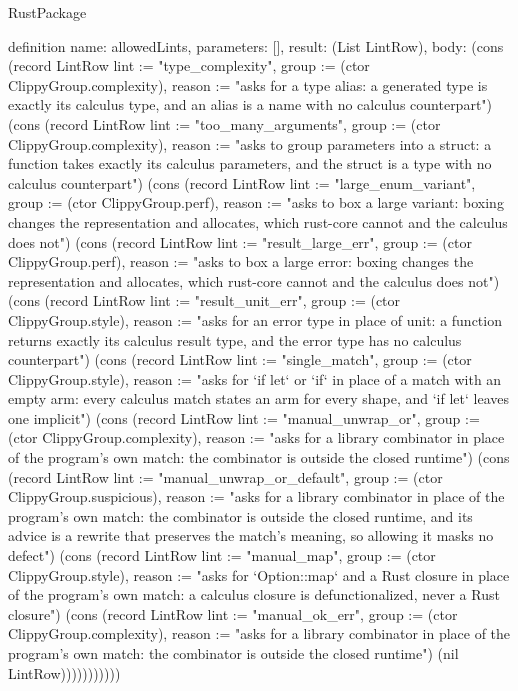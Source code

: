 \begin{lexlean}{RustPackage}
\begin{semanticmodule}
definition{
  name: allowedLints,
  parameters: [],
  result: (List LintRow),
  body: (cons (record LintRow {lint := "type_complexity", group := (ctor ClippyGroup.complexity), reason := "asks for a type alias: a generated type is exactly its calculus type, and an alias is a name with no calculus counterpart"}) (cons (record LintRow {lint := "too_many_arguments", group := (ctor ClippyGroup.complexity), reason := "asks to group parameters into a struct: a function takes exactly its calculus parameters, and the struct is a type with no calculus counterpart"}) (cons (record LintRow {lint := "large_enum_variant", group := (ctor ClippyGroup.perf), reason := "asks to box a large variant: boxing changes the representation and allocates, which rust-core cannot and the calculus does not"}) (cons (record LintRow {lint := "result_large_err", group := (ctor ClippyGroup.perf), reason := "asks to box a large error: boxing changes the representation and allocates, which rust-core cannot and the calculus does not"}) (cons (record LintRow {lint := "result_unit_err", group := (ctor ClippyGroup.style), reason := "asks for an error type in place of unit: a function returns exactly its calculus result type, and the error type has no calculus counterpart"}) (cons (record LintRow {lint := "single_match", group := (ctor ClippyGroup.style), reason := "asks for `if let` or `if` in place of a match with an empty arm: every calculus match states an arm for every shape, and `if let` leaves one implicit"}) (cons (record LintRow {lint := "manual_unwrap_or", group := (ctor ClippyGroup.complexity), reason := "asks for a library combinator in place of the program's own match: the combinator is outside the closed runtime"}) (cons (record LintRow {lint := "manual_unwrap_or_default", group := (ctor ClippyGroup.suspicious), reason := "asks for a library combinator in place of the program's own match: the combinator is outside the closed runtime, and its advice is a rewrite that preserves the match's meaning, so allowing it masks no defect"}) (cons (record LintRow {lint := "manual_map", group := (ctor ClippyGroup.style), reason := "asks for `Option::map` and a Rust closure in place of the program's own match: a calculus closure is defunctionalized, never a Rust closure"}) (cons (record LintRow {lint := "manual_ok_err", group := (ctor ClippyGroup.complexity), reason := "asks for a library combinator in place of the program's own match: the combinator is outside the closed runtime"}) (nil LintRow)))))))))))
}


\end{semanticmodule}
\end{lexlean}
